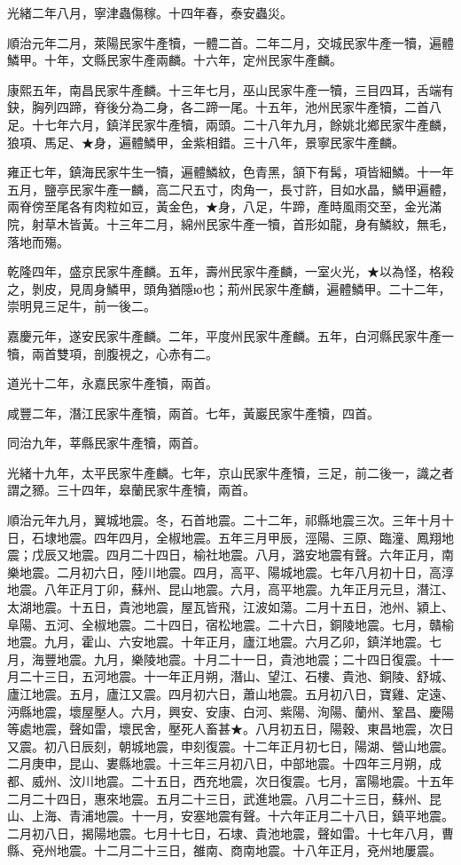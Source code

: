 \begin{pinyinscope}
光緒二年八月，寧津蟲傷稼。十四年春，泰安蟲災。

順治元年二月，萊陽民家牛產犢，一體二首。二年二月，交城民家牛產一犢，遍體鱗甲。十年，文縣民家牛產兩麟。十六年，定州民家牛產麟。

康熙五年，南昌民家牛產麟。十三年七月，巫山民家牛產一犢，三目四耳，舌端有鈌，胸列四蹄，脊後分為二身，各二蹄一尾。十五年，池州民家牛產犢，二首八足。十七年六月，鎮洋民家牛產犢，兩頭。二十八年九月，餘姚北鄉民家牛產麟，狼項、馬足、★身，遍體鱗甲，金紫相錯。三十八年，景寧民家牛產麟。

雍正七年，鎮海民家牛生一犢，遍體鱗紋，色青黑，頷下有髯，項皆細鱗。十一年五月，鹽亭民家牛產一麟，高二尺五寸，肉角一，長寸許，目如水晶，鱗甲遍體，兩脊傍至尾各有肉粒如豆，黃金色，★身，八足，牛蹄，產時風雨交至，金光滿院，射草木皆黃。十三年二月，綿州民家牛產一犢，首形如龍，身有鱗紋，無毛，落地而殤。

乾隆四年，盛京民家牛產麟。五年，壽州民家牛產麟，一室火光，★以為怪，格殺之，剝皮，見周身鱗甲，頭角猶隱ю也；荊州民家牛產麟，遍體鱗甲。二十二年，崇明見三足牛，前一後二。

嘉慶元年，遂安民家牛產麟。二年，平度州民家牛產麟。五年，白河縣民家牛產一犢，兩首雙項，剖腹視之，心赤有二。

道光十二年，永嘉民家牛產犢，兩首。

咸豐二年，潛江民家牛產犢，兩首。七年，黃巖民家牛產犢，四首。

同治九年，莘縣民家牛產犢，兩首。

光緒十九年，太平民家牛產麟。七年，京山民家牛產犢，三足，前二後一，識之者謂之豲。三十四年，皋蘭民家牛產犢，兩首。

順治元年九月，翼城地震。冬，石首地震。二十二年，祁縣地震三次。三年十月十日，石埭地震。四年四月，全椒地震。五年三月甲辰，涇陽、三原、臨潼、鳳翔地震；戊辰又地震。四月二十四日，榆社地震。八月，潞安地震有聲。六年正月，南樂地震。二月初六日，陸川地震。四月，高平、陽城地震。七年八月初十日，高淳地震。八年正月丁卯，蘇州、昆山地震。六月，高平地震。九年正月元旦，潛江、太湖地震。十五日，貴池地震，屋瓦皆飛，江波如蕩。二月十五日，池州、潁上、阜陽、五河、全椒地震。二十四日，宿松地震。二十六日，銅陵地震。七月，贛榆地震。九月，霍山、六安地震。十年正月，廬江地震。六月乙卯，鎮洋地震。七月，海豐地震。九月，樂陵地震。十月二十一日，貴池地震；二十四日復震。十一月二十三日，五河地震。十一年正月朔，潛山、望江、石樓、貴池、銅陵、舒城、廬江地震。五月，廬江又震。四月初六日，蕭山地震。五月初八日，寶雞、定遠、沔縣地震，壞屋壓人。六月，興安、安康、白河、紫陽、洵陽、蘭州、鞏昌、慶陽等處地震，聲如雷，壞民舍，壓死人畜甚★。八月初五日，陽穀、東昌地震，次日又震。初八日辰刻，朝城地震，申刻復震。十二年正月初七日，陽湖、營山地震。二月庚申，昆山、婁縣地震。十三年三月初八日，中部地震。十四年三月朔，成都、威州、汶川地震。二十五日，西充地震，次日復震。七月，富陽地震。十五年二月二十四日，惠來地震。五月二十三日，武進地震。八月二十三日，蘇州、昆山、上海、青浦地震。十一月，安塞地震有聲。十六年正月二十八日，鎮平地震。二月初八日，揭陽地震。七月十七日，石埭、貴池地震，聲如雷。十七年八月，曹縣、兗州地震。十二月二十三日，雒南、商南地震。十八年正月，兗州地屢震。


\end{pinyinscope}
